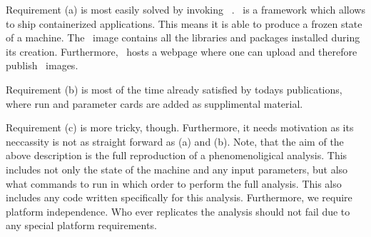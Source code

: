 Requirement (a) is most easily solved by invoking
\docker~\cite{}. \docker~is a framework which allows to ship
containerized applications. This means it is able to produce a frozen
state of a machine. The \docker~image contains all the libraries and
packages installed during its creation. Furthermore, \docker~hosts a
webpage where one can upload and therefore publish \docker~images.

Requirement (b) is most of the time already satisfied by todays
publications, where run and parameter cards are added as supplimental
material.

Requirement (c) is more tricky, though. Furthermore, it needs
motivation as its neccassity is not as straight forward as (a) and
(b). Note, that the aim of the above description is the full
reproduction of a phenomenoligical analysis. This includes not only
the state of the machine and any input parameters, but also what
commands to run in which order to perform the full analysis. This also
includes any code written specifically for this analysis. Furthermore,
we require platform independence. Who ever replicates the analysis
should not fail due to any special platform requirements.

